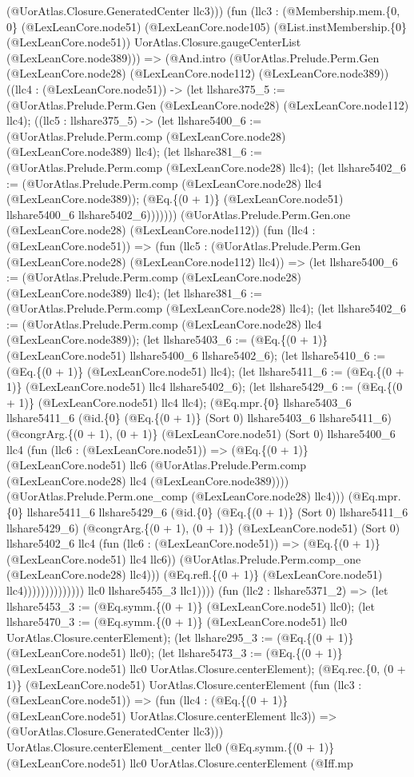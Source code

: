 \documentclass[11pt]{article}
\begin{document}
(@UorAtlas.Closure.GeneratedCenter llc3))) (fun (llc3 : (@Membership.mem.\{0, 0\} (@LexLeanCore.node51) (@LexLeanCore.node105) (@List.instMembership.\{0\} (@LexLeanCore.node51)) UorAtlas.Closure.gaugeCenterList (@LexLeanCore.node389))) => (@And.intro (@UorAtlas.Prelude.Perm.Gen (@LexLeanCore.node28) (@LexLeanCore.node112) (@LexLeanCore.node389)) ((llc4 : (@LexLeanCore.node51)) -> (let llshare375\_5 := (@UorAtlas.Prelude.Perm.Gen (@LexLeanCore.node28) (@LexLeanCore.node112) llc4); ((llc5 : llshare375\_5) -> (let llshare5400\_6 := (@UorAtlas.Prelude.Perm.comp (@LexLeanCore.node28) (@LexLeanCore.node389) llc4); (let llshare381\_6 := (@UorAtlas.Prelude.Perm.comp (@LexLeanCore.node28) llc4); (let llshare5402\_6 := (@UorAtlas.Prelude.Perm.comp (@LexLeanCore.node28) llc4 (@LexLeanCore.node389)); (@Eq.\{(0 + 1)\} (@LexLeanCore.node51) llshare5400\_6 llshare5402\_6))))))) (@UorAtlas.Prelude.Perm.Gen.one (@LexLeanCore.node28) (@LexLeanCore.node112)) (fun (llc4 : (@LexLeanCore.node51)) => (fun (llc5 : (@UorAtlas.Prelude.Perm.Gen (@LexLeanCore.node28) (@LexLeanCore.node112) llc4)) => (let llshare5400\_6 := (@UorAtlas.Prelude.Perm.comp (@LexLeanCore.node28) (@LexLeanCore.node389) llc4); (let llshare381\_6 := (@UorAtlas.Prelude.Perm.comp (@LexLeanCore.node28) llc4); (let llshare5402\_6 := (@UorAtlas.Prelude.Perm.comp (@LexLeanCore.node28) llc4 (@LexLeanCore.node389)); (let llshare5403\_6 := (@Eq.\{(0 + 1)\} (@LexLeanCore.node51) llshare5400\_6 llshare5402\_6); (let llshare5410\_6 := (@Eq.\{(0 + 1)\} (@LexLeanCore.node51) llc4); (let llshare5411\_6 := (@Eq.\{(0 + 1)\} (@LexLeanCore.node51) llc4 llshare5402\_6); (let llshare5429\_6 := (@Eq.\{(0 + 1)\} (@LexLeanCore.node51) llc4 llc4); (@Eq.mpr.\{0\} llshare5403\_6 llshare5411\_6 (@id.\{0\} (@Eq.\{(0 + 1)\} (Sort 0) llshare5403\_6 llshare5411\_6) (@congrArg.\{(0 + 1), (0 + 1)\} (@LexLeanCore.node51) (Sort 0) llshare5400\_6 llc4 (fun (llc6 : (@LexLeanCore.node51)) => (@Eq.\{(0 + 1)\} (@LexLeanCore.node51) llc6 (@UorAtlas.Prelude.Perm.comp (@LexLeanCore.node28) llc4 (@LexLeanCore.node389)))) (@UorAtlas.Prelude.Perm.one\_comp (@LexLeanCore.node28) llc4))) (@Eq.mpr.\{0\} llshare5411\_6 llshare5429\_6 (@id.\{0\} (@Eq.\{(0 + 1)\} (Sort 0) llshare5411\_6 llshare5429\_6) (@congrArg.\{(0 + 1), (0 + 1)\} (@LexLeanCore.node51) (Sort 0) llshare5402\_6 llc4 (fun (llc6 : (@LexLeanCore.node51)) => (@Eq.\{(0 + 1)\} (@LexLeanCore.node51) llc4 llc6)) (@UorAtlas.Prelude.Perm.comp\_one (@LexLeanCore.node28) llc4))) (@Eq.refl.\{(0 + 1)\} (@LexLeanCore.node51) llc4)))))))))))))) llc0 llshare5455\_3 llc1)))) (fun (llc2 : llshare5371\_2) => (let llshare5453\_3 := (@Eq.symm.\{(0 + 1)\} (@LexLeanCore.node51) llc0); (let llshare5470\_3 := (@Eq.symm.\{(0 + 1)\} (@LexLeanCore.node51) llc0 UorAtlas.Closure.centerElement); (let llshare295\_3 := (@Eq.\{(0 + 1)\} (@LexLeanCore.node51) llc0); (let llshare5473\_3 := (@Eq.\{(0 + 1)\} (@LexLeanCore.node51) llc0 UorAtlas.Closure.centerElement); (@Eq.rec.\{0, (0 + 1)\} (@LexLeanCore.node51) UorAtlas.Closure.centerElement (fun (llc3 : (@LexLeanCore.node51)) => (fun (llc4 : (@Eq.\{(0 + 1)\} (@LexLeanCore.node51) UorAtlas.Closure.centerElement llc3)) => (@UorAtlas.Closure.GeneratedCenter llc3))) UorAtlas.Closure.centerElement\_center llc0 (@Eq.symm.\{(0 + 1)\} (@LexLeanCore.node51) llc0 UorAtlas.Closure.centerElement (@Iff.mp 
\end{document}
